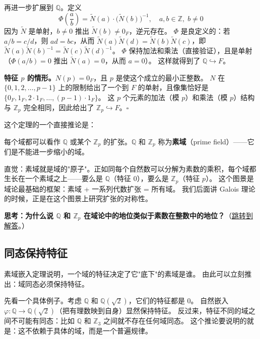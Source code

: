 再进一步扩展到 $\mathbb{Q}$。定义
\[\Phi\!\left(\frac{a}{b}\right) = \tilde{N}(a) \cdot \big(\tilde{N}(b)\big)^{-1}, \quad a, b \in \mathbb{Z},\; b \neq 0\]
因为 $\tilde{N}$ 是单射，$b \neq 0$ 推出 $\tilde{N}(b) \neq 0_F$，逆元存在。
$\Phi$ 是良定义的：若 $a/b = c/d$，则 $ad = bc$，从而 $\tilde{N}(a)\tilde{N}(d) = \tilde{N}(b)\tilde{N}(c)$，即 $\tilde{N}(a)\tilde{N}(b)^{-1} = \tilde{N}(c)\tilde{N}(d)^{-1}$。
$\Phi$ 保持加法和乘法（直接验证），且是单射（$\Phi(a/b) = 0$ 推出 $\tilde{N}(a) = 0$，从而 $a = 0$）。
这样就得到了 $\mathbb{Q} \hookrightarrow F$。

\textbf{特征 $p$ 的情形。}$N(p) = 0_F$，且 $p$ 是使这个成立的最小正整数。
$N$ 在 $\{0, 1, 2, \ldots, p-1\}$ 上的限制给出了一个到 $F$ 的单射，且像集恰好是 $\{0_F, 1_F, 2\cdot 1_F, \ldots, (p-1)\cdot 1_F\}$。
这 $p$ 个元素的加法（模 $p$）和乘法（模 $p$）结构与 $\mathbb{Z}_p$ 完全相同，因此给出了 $\mathbb{Z}_p \hookrightarrow F$。$\square$

这个定理的一个直接推论是：

\begin{corollary}[域的基本图景]\label{cor:prime-field}
每个域都可以看作 $\mathbb{Q}$ 或某个 $\mathbb{Z}_p$ 的扩张。$\mathbb{Q}$ 和 $\mathbb{Z}_p$ 称为\textbf{素域}（prime field）——它们是不能进一步缩小的域。
\end{corollary}

直觉：素域就是域的"原子"。正如同每个自然数可以分解为素数的乘积，每个域都生长在一个素域之上——要么是 $\mathbb{Q}$（特征 $0$），要么是 $\mathbb{Z}_p$（特征 $p$）。
这个图景是域论最基础的框架：素域 + 一系列代数扩张 = 所有域。
我们后面讲 Galois 理论的时候，正是在这个图景上研究扩张的对称性。

\hypertarget{q:prime-field-analogy}{}
\medskip
\noindent\textbf{思考：为什么说 $\mathbb{Q}$ 和 $\mathbb{Z}_p$ 在域论中的地位类似于素数在整数中的地位？}（\hyperlink{ans:prime-field-analogy}{跳转到解答}。）
\medskip

\subsection{同态保持特征}

素域嵌入定理说明，一个域的特征决定了它"底下"的素域是谁。
由此可以立刻推出：域同态必须保持特征。

先看一个具体例子。考虑 $\mathbb{Q}$ 和 $\mathbb{Q}(\sqrt{2})$，它们的特征都是 $0$。
自然嵌入 $\varphi: \mathbb{Q} \to \mathbb{Q}(\sqrt{2})$（把有理数映到自身）显然保持特征。
反过来，特征不同的域之间不可能有同态：比如 $\mathbb{Q}$ 和 $\mathbb{Z}_3$ 之间就不存在任何域同态。
这个推论要说明的就是：这不依赖于具体的域，而是一个普遍规律。

